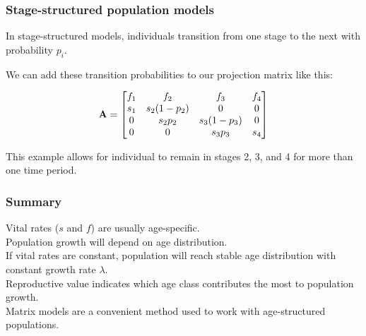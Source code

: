 \documentclass[color=usenames,dvipsnames]{beamer}\usepackage[]{graphicx}\usepackage[]{xcolor}
\begin{document}
\begin{frame}
  \frametitle{Stage-structured population models}
  \large
  {In stage-structured models, individuals transition from one
    stage to the next with probability $p_i$. \par
    \vfill
    \pause
    We can add these
    transition probabilities to our projection matrix like this:}
  \pause
  \vfill
  \begin{center}
    \[
    {\bf A} =
    \begin{bmatrix}
      f_1 & f_2 & f_3 & f_4 \\
      s_1 & s_2(1-p_2) & 0 & 0 \\
      0 & s_2 p_2 & s_3(1-p_3) & 0 \\
      0 & 0 & s_3p_3 & s_4
    \end{bmatrix}
    \]
  \end{center}
\pause
\vfill
This example allows for individual to remain in stages 2, 3, and 4 for 
more than one time period.
\end{frame}







\begin{frame}
  \frametitle{Summary}
  Vital rates ($s$ and $f$) are usually age-specific. \\
  \pause
  \vfill
  Population growth will depend on age distribution. \\
  \pause
  \vfill
  If vital rates are constant, population will reach stable
  age distribution with constant growth rate $\lambda$. \\
  \pause
  \vfill
  Reproductive value indicates which age class contributes the
  most to population growth. \\
  \pause
  \vfill
  Matrix models are a convenient method used to work with
  age-structured populations. \\
\end{frame}
\end{document}
